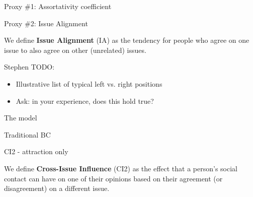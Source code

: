 \documentclass[12pt]{beamer}
\begin{document}
\begin{frame}[c]{Proxy \#1: Assortativity coefficient} %




\end{frame}


\begin{frame}[c]{Proxy \#2: Issue Alignment} %

We define \textbf{Issue Alignment} (IA) as the tendency for people who agree on
one issue to also agree on other (unrelated) issues.

{\tiny \color{red} 
Stephen TODO:

\begin{itemize}
\itemsep.1em
\item Illustrative list of typical left vs. right positions
\item Ask: in your experience, does this hold true?
\end{itemize}
}

\end{frame}

\begin{frame}[c]{The model}  %





\end{frame}


\begin{frame}[c]{Traditional BC}  %



\end{frame}


\begin{frame}[c]{CI2 - attraction only}  %

We define \textbf{Cross-Issue Influence} (CI2) as the effect that a person's
social contact can have on one of their opinions based on their agreement (or
disagreement) on a different issue.


\end{frame}
\end{document}
